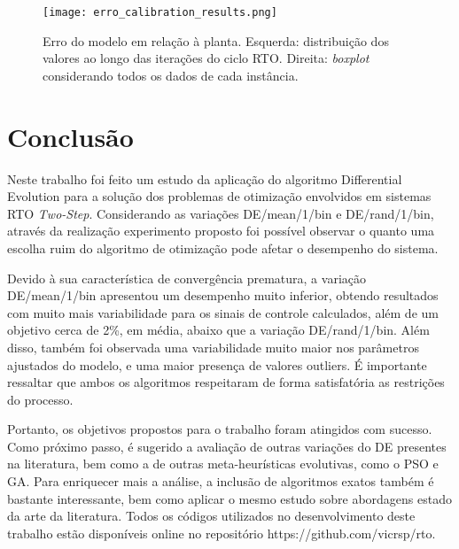 \documentclass[conference]{IEEEtran}
\begin{document}
\begin{figure}[h!]
	\centering
	\texttt{[image: erro\_calibration\_results.png]}
	\caption{Erro do modelo em relação à planta. Esquerda: distribuição dos valores ao longo das iterações do ciclo RTO. Direita: \textit{boxplot} considerando todos os dados de cada instância.}
	\label{fig:erro_calibration_results}
\end{figure}


\section{Conclusão}
Neste trabalho foi feito um estudo da aplicação do algoritmo Differential Evolution para a solução dos problemas de otimização envolvidos em sistemas RTO \textit{Two-Step}. Considerando as variações DE/mean/1/bin e DE/rand/1/bin, através da realização experimento proposto foi possível observar o quanto uma escolha ruim do algoritmo de otimização pode afetar o desempenho do sistema.

Devido à sua característica de convergência prematura, a variação DE/mean/1/bin apresentou um desempenho muito inferior, obtendo resultados com muito mais variabilidade para os sinais de controle calculados, além de um objetivo cerca de 2\%, em média, abaixo que a variação DE/rand/1/bin. Além disso, também foi observada uma variabilidade muito maior nos parâmetros ajustados do modelo, e uma maior presença de valores outliers. É importante ressaltar que ambos os algoritmos respeitaram de forma satisfatória as restrições do processo.

Portanto, os objetivos propostos para o trabalho foram atingidos com sucesso. Como próximo passo, é sugerido a avaliação de outras variações do DE presentes na literatura, bem como a de outras meta-heurísticas evolutivas, como o PSO e GA. Para enriquecer mais a análise, a inclusão de algoritmos exatos também é bastante interessante, bem como aplicar o mesmo estudo sobre abordagens estado da arte da literatura. Todos os códigos utilizados no desenvolvimento deste trabalho estão disponíveis online no repositório https://github.com/vicrsp/rto.





\end{document}
